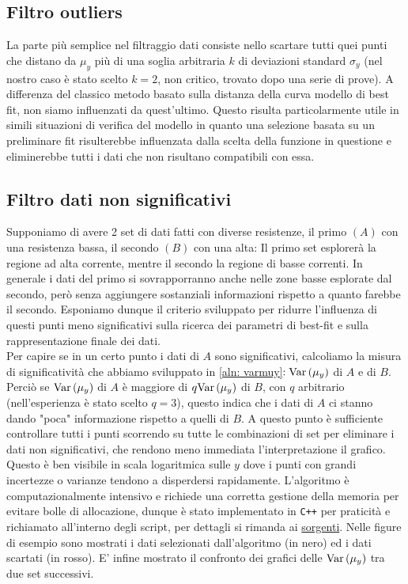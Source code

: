 \documentclass{article}[a4paper, oneside, 11pt]
\begin{document}
\subsection{Filtro outliers}
La parte più semplice nel filtraggio dati consiste nello scartare tutti quei
punti che distano da $\mu_y$ più di una soglia arbitraria $k$ di deviazioni
standard $\sigma_y$ (nel nostro caso è stato scelto $k = 2$, non critico,
trovato dopo una serie di prove). A differenza del classico metodo basato
sulla distanza della curva modello di best fit, non siamo influenzati da
quest’ultimo. Questo risulta particolarmente utile in simili situazioni di
verifica del modello in quanto una selezione basata su un preliminare fit
risulterebbe influenzata dalla scelta della funzione in questione e
eliminerebbe tutti i dati che non risultano compatibili con essa.

\subsection{Filtro dati non significativi}
Supponiamo di avere 2 set di dati fatti con diverse resistenze, il primo $(A)$
con una resistenza bassa, il secondo $(B)$ con una alta: Il primo set esplorerà
la regione ad alta corrente, mentre il secondo la regione di basse correnti.
In generale i dati del primo si sovrapporranno anche nelle zone basse esplorate
dal secondo, però senza aggiungere sostanziali informazioni rispetto a quanto
farebbe il secondo.
Esponiamo dunque il criterio sviluppato per ridurre l'influenza di questi
punti meno significativi sulla ricerca dei parametri di best-fit e sulla
rappresentazione finale dei dati.\\
Per capire se in un certo punto i dati di $A$ sono significativi, calcoliamo
la misura di significatività che abbiamo sviluppato in \eqref{aln: varmuy}$:
\text{Var}\left(\mu_y\right)$ di $A$ e di $B$. Perciò se $\text{Var}\left(\mu_y\right)$ di $A$ è maggiore di 
$q\text{Var}\left(\mu_y\right)$ di $B$, con $q$ arbitrario (nell’esperienza è stato scelto
$q = 3$), questo indica che i dati di $A$
ci stanno dando "poca" informazione rispetto a quelli di $B$. A questo punto
è sufficiente controllare tutti i punti scorrendo su tutte le combinazioni
di set per eliminare i dati non significativi, che rendono meno
immediata l'interpretazione il grafico. Questo è ben visibile in scala
logaritmica sulle $y$ dove i punti con grandi incertezze o varianze tendono
a disperdersi rapidamente.
L’algoritmo è computazionalmente intensivo e richiede una corretta gestione
della memoria per evitare bolle di allocazione, dunque è stato implementato
in \verb'C++' per praticità e richiamato all’interno degli script, per dettagli si 
rimanda ai 
\href{https://github.com/LucaCiucci/relaz_seme/tree/master/Cartella_fit/filter_src}{sorgenti}.
Nelle figure di esempio sono mostrati i dati selezionati dall’algoritmo
(in nero) ed i dati scartati (in rosso). 
E’ infine mostrato il confronto dei grafici delle $\text{Var}\left(\mu_y\right)$
tra due set successivi.
\end{document}
